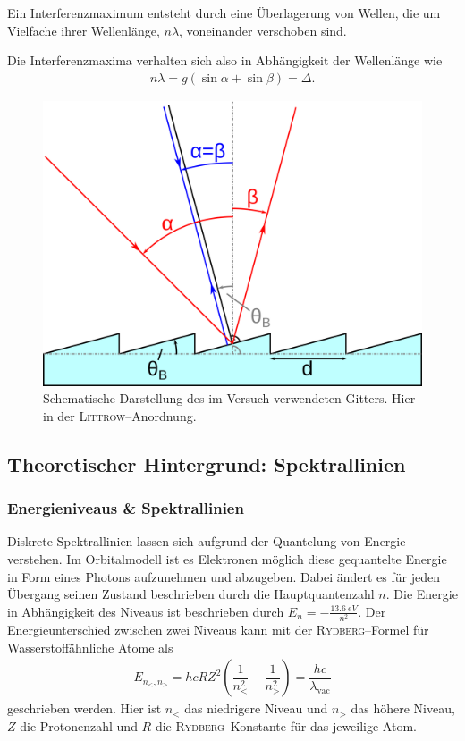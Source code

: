 \documentclass[sn-mathphys-num,iicol]{sn-jnl}
\theoremstyle{thmstyleone}
\theoremstyle{thmstyletwo}
\theoremstyle{thmstylethree}
\begin{document}
Ein Interferenzmaximum entsteht durch eine Überlagerung von Wellen, die um Vielfache ihrer Wellenlänge, $n \lambda $, voneinander verschoben sind.

Die Interferenzmaxima verhalten sich also in Abhängigkeit der Wellenlänge wie
\begin{align} 
        n \lambda =g\left(\sin \alpha +\sin \beta \right)=\Delta 
.\end{align} 
\begin{figure}[t]
        \centering
        \includegraphics[width=.5\textwidth]{402_stufengitter.png}
        \caption{Schematische Darstellung des im Versuch verwendeten Gitters. Hier in der \textsc{Littrow}--Anordnung.\cite{WikipediaBlazegitter}} \label{fig:blazegitter}
\end{figure}

\subsection{Theoretischer Hintergrund: Spektrallinien}
\subsubsection{Energieniveaus \& Spektrallinien}
Diskrete Spektrallinien lassen sich aufgrund der Quantelung von Energie verstehen.
Im Orbitalmodell ist es Elektronen möglich diese gequantelte Energie in Form eines Photons aufzunehmen und abzugeben.
Dabei ändert es für jeden Übergang seinen Zustand beschrieben durch die Hauptquantenzahl $n$.
Die Energie in Abhängigkeit des Niveaus ist beschrieben durch $E_n=-\tfrac{\SI{13.6}{eV}}{n^2}$.
Der Energieunterschied zwischen zwei Niveaus kann mit der \textsc{Rydberg}--Formel für Wasserstoffähnliche Atome als 
\begin{align} 
        E_{n_<,n_>}=hcRZ^2\left(\dfrac{1}{n_<^2}-\dfrac{1}{n_>^2}\right)=\dfrac{hc}{\lambda _\text{vac}}
\end{align} 
geschrieben werden.
Hier ist $n_<$ das niedrigere Niveau und $n_>$ das höhere Niveau, $Z$ die Protonenzahl und $R$ die \textsc{Rydberg}--Konstante für das jeweilige Atom.
\end{document}
